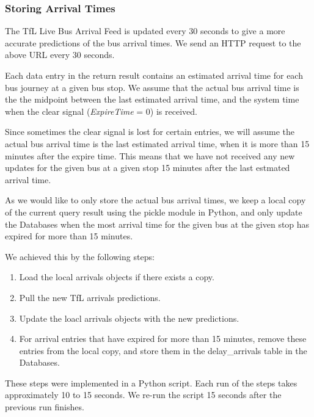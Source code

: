 \subsubsection{Storing Arrival Times}
\par The TfL Live Bus Arrival Feed is updated every 30 seconds to give a more accurate predictions of the bus arrival times. We send an HTTP request to the above URL every 30 seconds.

\par Each data entry in the return result contains an estimated arrival time for each bus journey at a given bus stop. We assume that the actual bus arrival time is the the midpoint between the last estimated arrival time, and the system time when the clear signal (\textit{ExpireTime} = 0) is received.

\par Since sometimes the clear signal is lost for certain entries, we will assume the actual bus arrival time is the last estimated arrival time, when it is more than 15 minutes after the expire time. This means that we have not received any new updates for the given bus at a given stop 15 minutes after the last estmated arrival time.

\par As we would like to only store the actual bus arrival times, we keep a local copy of the current query result using the pickle module in Python\cite{pickle}, and only update the Databases when the most arrival time for the given bus at the given stop has expired for more than 15 minutes.

\par We achieved this by the following steps:

\begin{enumerate}
  \item Load the local arrivals objects if there exists a copy.
  \item Pull the new TfL arrivals predictions.
  \item Update the loacl arrivals objects with the new predictions.
  \item For arrival entries that have expired for more than 15 minutes, remove these entries from the local copy, and store them in the delay\_arrivals table in the Databases.
\end{enumerate}

These steps were implemented in a Python script. Each run of the steps takes approximately 10 to 15 seconds. We re-run the script 15 seconds after the previous run finishes.

